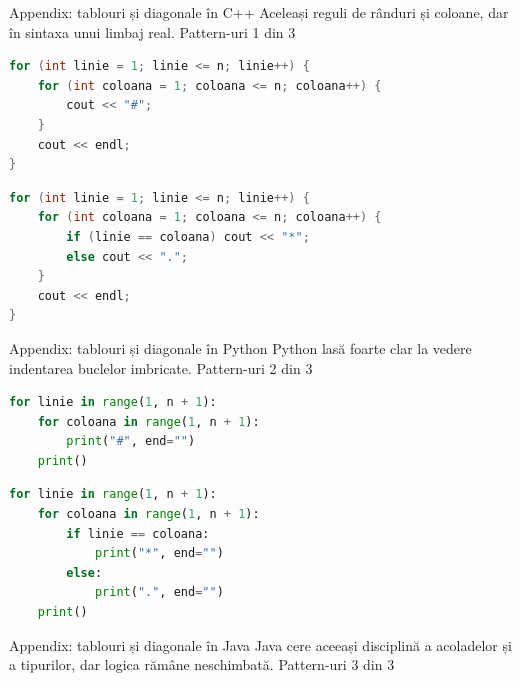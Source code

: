 \PageHeader
  {Appendix: tablouri și diagonale în C++}
  {Aceleași reguli de rânduri și coloane, dar în sintaxa unui limbaj real.}
  {Pattern-uri 1 din 3}

\begin{examplebox}
\begin{lstlisting}[style=languagequest,language=C++]
for (int linie = 1; linie <= n; linie++) {
    for (int coloana = 1; coloana <= n; coloana++) {
        cout << "#";
    }
    cout << endl;
}
\end{lstlisting}
\end{examplebox}

\begin{examplebox}
\begin{lstlisting}[style=languagequest,language=C++]
for (int linie = 1; linie <= n; linie++) {
    for (int coloana = 1; coloana <= n; coloana++) {
        if (linie == coloana) cout << "*";
        else cout << ".";
    }
    cout << endl;
}
\end{lstlisting}
\end{examplebox}

\clearpage

\PageHeader
  {Appendix: tablouri și diagonale în Python}
  {Python lasă foarte clar la vedere indentarea buclelor imbricate.}
  {Pattern-uri 2 din 3}

\begin{examplebox}
\begin{lstlisting}[style=languagequest,language=Python]
for linie in range(1, n + 1):
    for coloana in range(1, n + 1):
        print("#", end="")
    print()
\end{lstlisting}
\end{examplebox}

\begin{examplebox}
\begin{lstlisting}[style=languagequest,language=Python]
for linie in range(1, n + 1):
    for coloana in range(1, n + 1):
        if linie == coloana:
            print("*", end="")
        else:
            print(".", end="")
    print()
\end{lstlisting}
\end{examplebox}

\clearpage

\PageHeader
  {Appendix: tablouri și diagonale în Java}
  {Java cere aceeași disciplină a acoladelor și a tipurilor, dar logica rămâne neschimbată.}
  {Pattern-uri 3 din 3}


